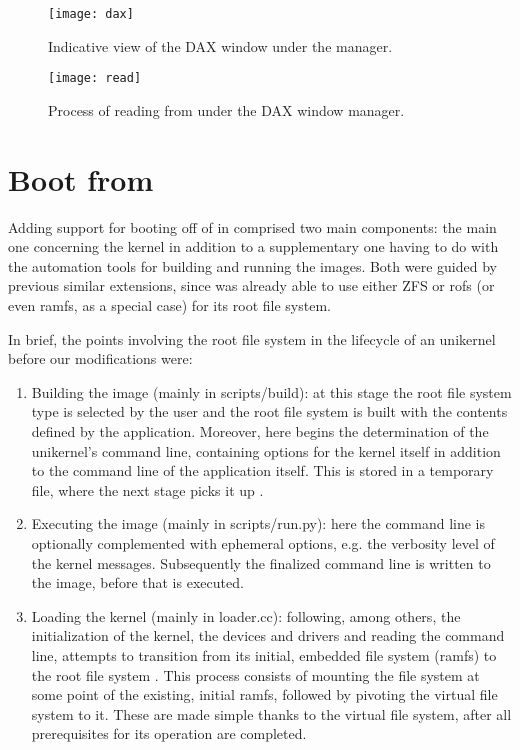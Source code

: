 \begin{figure}
    \centering
    \texttt{[image: dax]}
    \caption{Indicative view of the DAX window under the manager.}
    \label{fig:dax-overview}
\end{figure}

\begin{figure}
    \begin{minipage}[c][\textheight]{\textwidth}
        \centering
        \texttt{[image: read]}
        \caption{Process of reading from \viofs{} under the DAX window manager.}
        \label{fig:dax-flowchart}
    \end{minipage}
\end{figure}

\section{Boot from \viofs{}}

Adding support for booting off of \viofs{} in \osv{} comprised two main
components: the main one concerning the kernel in addition to a supplementary
one having to do with the automation tools for building and running the images.
Both were guided by previous similar extensions, since \osv{} was already able
to use either ZFS or rofs (or even ramfs, as a special case) for its root file
system.

In brief, the points involving the root file system in the lifecycle of an
\osv{} unikernel before our modifications were:
\begin{enumerate}
    \item Building the image (mainly in scripts/build): at this stage the root
          file system type is selected by the user and the root file system is
          built with the contents defined by the application. Moreover, here
          begins the determination of the unikernel's command line, containing
          options for the kernel itself in addition to the command line of the
          application itself. This is stored in a temporary file, where the next
          stage picks it up \cite{osv-wiki:osv-components}.
    \item Executing the image (mainly in scripts/run.py): here the command line
          is optionally complemented with ephemeral options, e.g. the verbosity
          level of the kernel messages. Subsequently the finalized command line
          is written to the image, before that is executed.
    \item Loading the kernel (mainly in loader.cc): following, among others,
          the initialization of the kernel, the devices and drivers and reading
          the command line, \osv{} attempts to transition from its initial,
          embedded file system (ramfs) to the root file system
          \cite{osv-wiki:osv-loader}. This process consists of mounting the file
          system at some point of the existing, initial ramfs, followed by
          pivoting the virtual file system to it. These are made simple thanks
          to the virtual file system, after all prerequisites for its operation
          are completed.
\end{enumerate}

